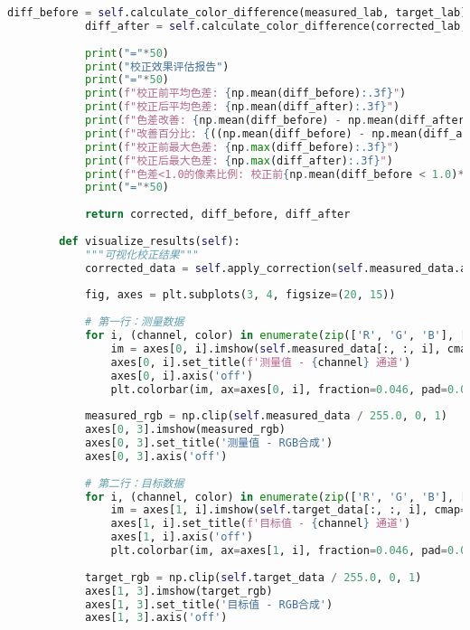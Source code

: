 \begin{lstlisting}[language=Python]
            diff_before = self.calculate_color_difference(measured_lab, target_lab)
            diff_after = self.calculate_color_difference(corrected_lab, target_lab)
            
            print("="*50)
            print("校正效果评估报告")
            print("="*50)
            print(f"校正前平均色差: {np.mean(diff_before):.3f}")
            print(f"校正后平均色差: {np.mean(diff_after):.3f}")
            print(f"色差改善: {np.mean(diff_before) - np.mean(diff_after):.3f}")
            print(f"改善百分比: {((np.mean(diff_before) - np.mean(diff_after)) / np.mean(diff_before) * 100):.1f}%")
            print(f"校正前最大色差: {np.max(diff_before):.3f}")
            print(f"校正后最大色差: {np.max(diff_after):.3f}")
            print(f"色差<1.0的像素比例: 校正前{np.mean(diff_before < 1.0)*100:.1f}%, 校正后{np.mean(diff_after < 1.0)*100:.1f}%")
            print("="*50)
            
            return corrected, diff_before, diff_after
        
        def visualize_results(self):
            """可视化校正结果"""
            corrected_data = self.apply_correction(self.measured_data.astype(np.float32))
            
            fig, axes = plt.subplots(3, 4, figsize=(20, 15))
            
            # 第一行：测量数据
            for i, (channel, color) in enumerate(zip(['R', 'G', 'B'], ['Reds', 'Greens', 'Blues'])):
                im = axes[0, i].imshow(self.measured_data[:, :, i], cmap=color, vmin=0, vmax=255)
                axes[0, i].set_title(f'测量值 - {channel} 通道')
                axes[0, i].axis('off')
                plt.colorbar(im, ax=axes[0, i], fraction=0.046, pad=0.04)
            
            measured_rgb = np.clip(self.measured_data / 255.0, 0, 1)
            axes[0, 3].imshow(measured_rgb)
            axes[0, 3].set_title('测量值 - RGB合成')
            axes[0, 3].axis('off')
            
            # 第二行：目标数据
            for i, (channel, color) in enumerate(zip(['R', 'G', 'B'], ['Reds', 'Greens', 'Blues'])):
                im = axes[1, i].imshow(self.target_data[:, :, i], cmap=color, vmin=0, vmax=255)
                axes[1, i].set_title(f'目标值 - {channel} 通道')
                axes[1, i].axis('off')
                plt.colorbar(im, ax=axes[1, i], fraction=0.046, pad=0.04)
            
            target_rgb = np.clip(self.target_data / 255.0, 0, 1)
            axes[1, 3].imshow(target_rgb)
            axes[1, 3].set_title('目标值 - RGB合成')
            axes[1, 3].axis('off')
            

\end{lstlisting}
